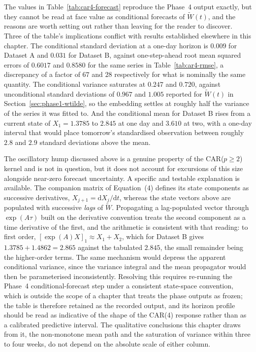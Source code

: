 The values in Table~\ref{tab:car4-forecast} reproduce the Phase~4 output exactly, but they cannot be read at face value as conditional forecasts of $\widetilde W(t)$, and the reasons are worth setting out rather than leaving for the reader to discover. Three of the table's implications conflict with results established elsewhere in this chapter. The conditional standard deviation at a one-day horizon is $0.009$ for Dataset A and $0.031$ for Dataset B, against one-step-ahead root mean squared errors of $0.6017$ and $0.8580$ for the same series in Table~\ref{tab:ar4-rmse}, a discrepancy of a factor of $67$ and $28$ respectively for what is nominally the same quantity. The conditional variance saturates at $0.247$ and $0.720$, against unconditional standard deviations of $0.967$ and $1.005$ reported for $\widetilde W(t)$ in Section~\ref{sec:phase1-wtilde}, so the embedding settles at roughly half the variance of the series it was fitted to. And the conditional mean for Dataset B rises from a current state of $X_1 = 1.3785$ to $2.845$ at one day and $3.610$ at two, with a one-day interval that would place tomorrow's standardised observation between roughly $2.8$ and $2.9$ standard deviations above the mean.

The oscillatory hump discussed above is a genuine property of the CAR($p \geq 2$) kernel and is not in question, but it does not account for excursions of this size alongside near-zero forecast uncertainty. A specific and testable explanation is available. The companion matrix of Equation~(4) defines its state components as successive derivatives, $X_{j+1} = \mathrm dX_j/\mathrm dt$, whereas the state vectors above are populated with successive \emph{lags} of $\widetilde W$. Propagating a lag-populated vector through $\exp(A\tau)$ built on the derivative convention treats the second component as a time derivative of the first, and the arithmetic is consistent with that reading: to first order, $[\exp(A)X]_1 \approx X_1 + X_2$, which for Dataset B gives $1.3785 + 1.4862 = 2.865$ against the tabulated $2.845$, the small remainder being the higher-order terms. The same mechanism would depress the apparent conditional variance, since the variance integral and the mean propagator would then be parameterised inconsistently. Resolving this requires re-running the Phase~4 conditional-forecast step under a consistent state-space convention, which is outside the scope of a chapter that treats the phase outputs as frozen; the table is therefore retained as the recorded output, and its horizon profile should be read as indicative of the shape of the CAR(4) response rather than as a calibrated predictive interval. The qualitative conclusions this chapter draws from it, the non-monotone mean path and the saturation of variance within three to four weeks, do not depend on the absolute scale of either column.

